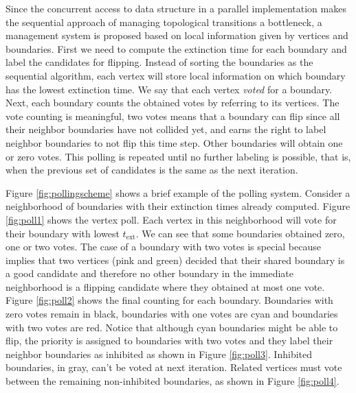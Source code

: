 Since the concurrent access to data structure in a parallel implementation makes the sequential approach of managing topological transitions a bottleneck, a management system is proposed based on local information given by vertices and boundaries. First we need to compute the extinction time for each boundary and label the candidates for flipping. Instead of sorting the boundaries as the sequential algorithm, each vertex will store local information on which boundary has the lowest extinction time. We say that each vertex \emph{voted} for a boundary. Next, each boundary counts the obtained votes by referring to its vertices. The vote counting is meaningful, two votes means that a boundary can flip since all their neighbor boundaries have not collided yet, and earns the right to label neighbor boundaries to not flip this time step. Other boundaries will obtain one or zero votes.
This polling is repeated until no further labeling is possible, that is, when the previous set of candidates is the same as the next iteration.

Figure \ref{fig:pollingscheme} shows a brief example of the polling system. Consider a neighborhood of boundaries with their extinction times already computed. Figure \ref{fig:poll1} shows the vertex poll. Each vertex in this neighborhood will vote for their boundary with lowest $t_{\text{ext}}$. We can see that some boundaries obtained zero, one or two votes. The case of a boundary with two votes is special because implies that two vertices (pink and green) decided that their shared boundary is a good candidate and therefore no other boundary in the immediate neighborhood is a flipping candidate where they obtained at most one vote. Figure \ref{fig:poll2} shows the final counting for each boundary. Boundaries with zero votes remain in black, boundaries with one votes are cyan and boundaries with two votes are red. Notice that although cyan boundaries might be able to flip, the priority is assigned to boundaries with two votes and they label their neighbor boundaries as inhibited as shown in Figure \ref{fig:poll3}. Inhibited boundaries, in gray, can't be voted at next iteration. Related vertices must vote between the remaining non-inhibited boundaries, as shown in Figure \ref{fig:poll4}.

